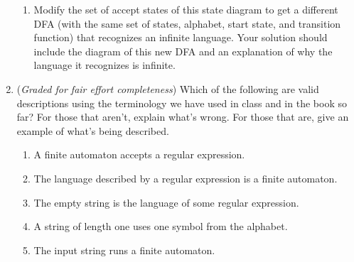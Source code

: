 \documentclass[12pt, oneside]{article}
\begin{document}
\begin{enumerate}
\begin{enumerate}
\item Modify the set of accept states of this state diagram to get a different DFA 
(with the same set of states, alphabet, start state, and transition function) 
that recognizes an infinite language. Your solution should include the 
diagram of this new DFA and an explanation of why the language it recognizes
is infinite.
\end{enumerate}


\item ({\it Graded for fair effort completeness})
Which of the following are valid descriptions using the terminology we have used in 
class and in the book so far? For those that aren't, explain what's wrong. For those that are, 
give an example of what's being described.
\begin{enumerate}
\item A finite automaton accepts a regular expression.
\item The language described by a regular expression is a finite automaton.
\item The empty string is the language of some regular expression.
\item A string of length one uses one symbol from the alphabet.
\item The input string runs a finite automaton.
\end{enumerate}


\end{enumerate}
\end{document}
